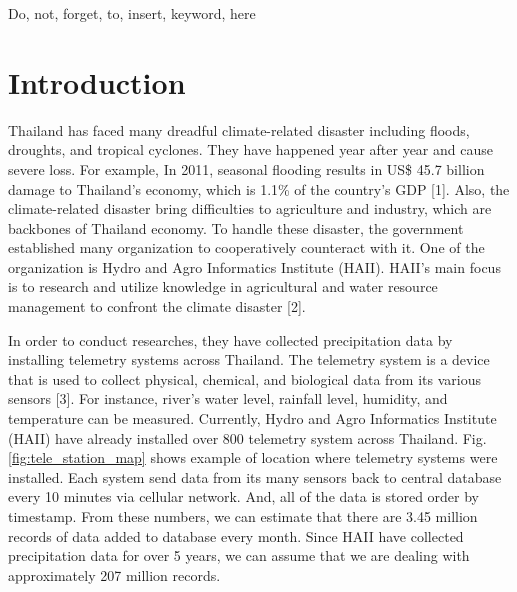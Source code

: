 \documentclass[conference]{IEEEtran}
\begin{document}
\begin{IEEEkeywords}
\color{red} Do, not, forget, to, insert, keyword, here
\end{IEEEkeywords}

\IEEEpeerreviewmaketitle

\section{Introduction} \label{sec:intro}

Thailand has faced many dreadful climate-related disaster including floods, droughts, and tropical cyclones. They have happened year after year and cause severe loss. For example, In 2011, seasonal flooding results in US\$ 45.7 billion damage to Thailand’s economy, which is 1.1\% of the country’s GDP [1]. Also, the climate-related disaster bring difficulties to agriculture and industry, which are backbones of Thailand economy. To handle these disaster, the government established many organization to cooperatively counteract with it. One of the organization is Hydro and Agro Informatics Institute (HAII). HAII's main focus is to research and utilize knowledge in agricultural and water resource management to confront the climate disaster [2].

In order to conduct researches, they have collected precipitation data by installing telemetry systems across Thailand. The telemetry system is a device that is used to collect physical, chemical, and biological data from its various sensors [3]. For instance, river’s water level, rainfall level, humidity, and temperature can be measured. Currently, Hydro and Agro Informatics Institute (HAII) have already installed over 800 telemetry system across Thailand. Fig. \ref{fig:tele_station_map} shows example of location where telemetry systems were installed. Each system send data from its many sensors back to central database every 10 minutes via cellular network. And, all of the data is stored order by timestamp. From these numbers, we can estimate that there are 3.45 million records of data added to database every month. Since HAII have collected precipitation data for over 5 years, we can assume that we are dealing with approximately 207 million records.
\end{document}
